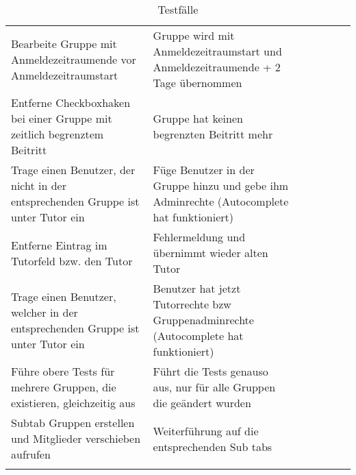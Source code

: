 \begin{table}[]
	\centering
	\caption{Testfälle}
	\label{table2}
	\begin{tabular}{p{6cm}p{7cm}p{3cm}llll}
		Bearbeite Gruppe mit Anmeldezeitraumende vor Anmeldezeitraumstart                                                                    & Gruppe wird mit Anmeldezeitraumstart und Anmeldezeitraumende + 2 Tage übernommen                                                                                 & \checkmark            &  &  &  \\
		
		Entferne Checkboxhaken bei einer Gruppe mit zeitlich begrenztem Beitritt                                                             & Gruppe hat keinen begrenzten Beitritt mehr                                                                                                                       & \checkmark           &  &  &  \\
		Trage einen Benutzer, der nicht in der entsprechenden Gruppe ist unter Tutor ein                                                      & Füge Benutzer in der Gruppe hinzu und gebe ihm Adminrechte (Autocomplete hat funktioniert)                                                                       & \checkmark           &  &  &  \\
		Entferne Eintrag im Tutorfeld bzw. den Tutor                                                                                         & Fehlermeldung und übernimmt wieder alten Tutor                                                                                                                   &             &  &  &  \\
		Trage einen Benutzer, welcher in der entsprechenden Gruppe ist unter Tutor ein                                                        & Benutzer hat jetzt Tutorrechte bzw Gruppenadminrechte (Autocomplete hat funktioniert)                                                                            & \checkmark           &  &  &  \\
		Führe obere Tests für mehrere Gruppen, die existieren, gleichzeitig aus                                                                & Führt die Tests genauso aus, nur für alle Gruppen die geändert wurden                                                                                             & \checkmark           &  &  &  \\

		Subtab Gruppen erstellen und Mitglieder verschieben aufrufen                                                                         & Weiterführung auf die entsprechenden Sub tabs                                                                                                                    & \checkmark           &  &  &  \\&                                                                                                                                                                  &             &  &  &  \\
	

\end{tabular}
\end{table}
